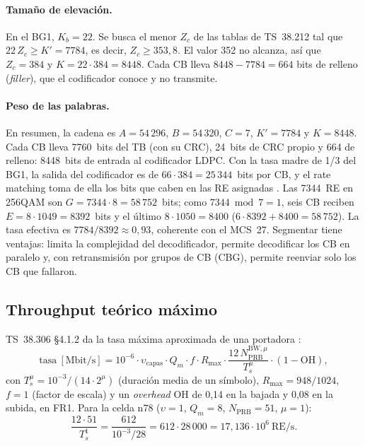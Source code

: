 \paragraph{Tamaño de elevación.} En el BG1, $K_b = 22$. Se busca el menor $Z_c$ de las tablas de TS~38.212 tal que $22\,Z_c\ge K' = 7784$, es decir, $Z_c\ge 353{,}8$. El valor 352 no alcanza, así que $Z_c = 384$ y $K = 22\cdot 384 = 8448$. Cada CB lleva $8448 - 7784 = 664$ bits de relleno (\emph{filler}), que el codificador conoce y no transmite.

\paragraph{Peso de las palabras.} En resumen, la cadena es $A=54\,296$, $B=54\,320$, $C=7$, $K'=7784$ y $K=8448$. Cada CB lleva 7760~bits del TB (con su CRC), 24~bits de CRC propio y 664 de relleno: 8448~bits de entrada al codificador LDPC. Con la tasa madre de 1/3 del BG1, la salida del codificador es de $66\cdot 384 = 25\,344$~bits por CB, y el rate matching toma de ella los bits que caben en las RE asignadas \cite[§5.4.2]{ts38212}. Las 7344~RE en 256QAM son $G = 7344\cdot 8 = 58\,752$~bits; como $7344 \bmod 7 = 1$, seis CB reciben $E = 8\cdot 1049 = 8392$~bits y el último $8\cdot 1050 = 8400$ ($6\cdot 8392 + 8400 = 58\,752$). La tasa efectiva es $7784/8392\approx 0{,}93$, coherente con el MCS~27. Segmentar tiene ventajas: limita la complejidad del decodificador, permite decodificar los CB en paralelo y, con retransmisión por grupos de CB (CBG), permite reenviar solo los CB que fallaron.

\subsection{Throughput teórico máximo}\label{sec:tput}
TS~38.306 §4.1.2 da la tasa máxima aproximada de una portadora \cite{ts38306}:
\begin{equation}
\text{tasa}~[\text{Mbit/s}] = 10^{-6}\cdot \upsilon_\text{capas}\cdot Q_m\cdot f\cdot R_\text{max}\cdot \frac{12\,N_\text{PRB}^{\text{BW},\mu}}{T_s^\mu}\cdot (1-\text{OH}),
\label{eq:38306}
\end{equation}
con $T_s^\mu = 10^{-3}/(14\cdot 2^\mu)$ (duración media de un símbolo), $R_\text{max}=948/1024$, $f=1$ (factor de escala) y un \emph{overhead} OH de 0,14 en la bajada y 0,08 en la subida, en FR1. Para la celda n78 ($\upsilon=1$, $Q_m=8$, $N_\text{PRB}=51$, $\mu=1$):
\begin{equation}
\frac{12\cdot 51}{T_s^1} = \frac{612}{10^{-3}/28} = 612\cdot 28\,000 = 17{,}136\cdot 10^6~\text{RE/s}.
\end{equation}
